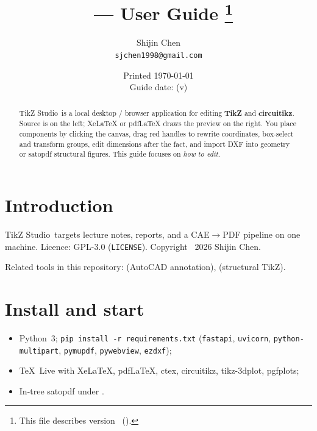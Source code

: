 \documentclass[a4paper]{ltxdoc}
\title{%
  \appname\ --- User Guide%
  \thanks{This file describes version~\fileversion{} (\filedate).}%
}
\author{%
  Shijin Chen\\
  \texttt{sjchen1998@gmail.com}%
}
\date{Printed \today\\[0.5em] Guide date: \filedate{} (v\fileversion)}
\newcommand{\appname}{\textsf{TikZ Studio}}
\begin{document}
\maketitle

\begin{abstract}
\appname\ is a local desktop / browser application for editing
\textbf{TikZ} and \textbf{circuitikz}.  Source is on the left; XeLaTeX or
pdfLaTeX draws the preview on the right.  You place components by
clicking the canvas, drag red handles to rewrite coordinates, box-select
and transform groups, edit dimensions after the fact, and import DXF
into geometry or \textsf{satopdf} structural figures.  This guide focuses
on \emph{how to edit}.
\end{abstract}

\tableofcontents
\clearpage

\section{Introduction}

\appname\ targets lecture notes, reports, and a CAE$\rightarrow$PDF
pipeline on one machine.  Licence: GPL-3.0 (\texttt{LICENSE}).
Copyright \textcopyright\ 2026 Shijin Chen.

Related tools in this repository:  (AutoCAD
annotation),  (structural TikZ).

\section{Install and start}

\begin{itemize}[nosep]
  \item Python~3; \texttt{pip install -r requirements.txt}
        (\texttt{fastapi}, \texttt{uvicorn}, \texttt{python-multipart},
        \texttt{pymupdf}, \texttt{pywebview}, \texttt{ezdxf});
  \item TeX~Live with XeLaTeX, pdfLaTeX, \textsf{ctex}, \textsf{circuitikz},
        \textsf{tikz-3dplot}, \textsf{pgfplots};
  \item In-tree \textsf{satopdf} under .
\end{itemize}
\end{document}
